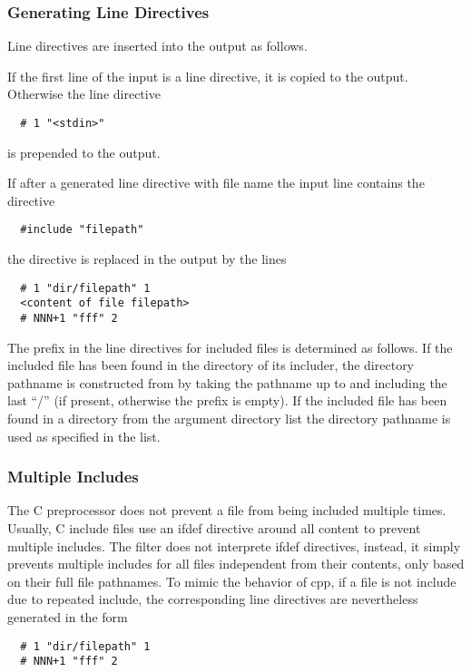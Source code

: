 \subsubsection{Generating Line Directives}

Line directives are inserted into the output as follows.

If the first line of the input is a line directive, it is copied to the output. Otherwise 
the line directive
\begin{verbatim}
  # 1 "<stdin>"
\end{verbatim}
is prepended to the output.

If after a generated line directive with file name  the input line  contains the 
directive 
\begin{verbatim}
  #include "filepath"
\end{verbatim}
the directive is replaced in the output by the lines 
\begin{verbatim}
  # 1 "dir/filepath" 1
  <content of file filepath>
  # NNN+1 "fff" 2
\end{verbatim}

The  prefix in the line directives for included files is determined as follows. 
If the included file has been found in the 
directory of its includer, the directory pathname is constructed from  by taking the pathname 
up to and including the last ``/'' (if present, otherwise the prefix is empty).
If the included file has been found in a directory from the argument directory list
the directory pathname is used as specified in the list.

\subsubsection{Multiple Includes}

The C preprocessor does not prevent a file from being included multiple times. Usually, C include files use
an ifdef directive around all content to prevent multiple includes. The  filter does
not interprete ifdef directives, instead, it simply prevents multiple includes for all files independent 
from their contents, only based on their full file pathnames. To mimic the behavior of cpp, if a file is 
not include due to repeated include, the corresponding line directives are nevertheless generated in the form
\begin{verbatim}
  # 1 "dir/filepath" 1
  # NNN+1 "fff" 2
\end{verbatim}

